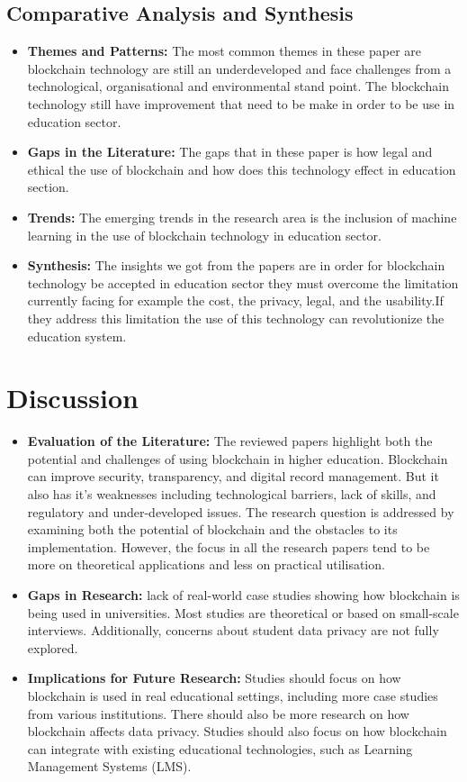 \documentclass[12pt,a4paper]{article}
\begin{document}
\subsection{Comparative Analysis and Synthesis}
\begin{itemize}
    \item \textbf{Themes and Patterns:} The most common themes in these paper are blockchain technology are still an underdeveloped and face challenges from a technological, organisational and environmental stand point. The blockchain technology still have improvement that need to be make in order to be use in education sector.
    \item \textbf{Gaps in the Literature:} The gaps that in these paper is how legal and ethical the use of blockchain and how does this technology effect in education section.
    \item \textbf{Trends:} The emerging trends in the research area is the inclusion of machine learning in the use of blockchain technology in education sector. 
    \item \textbf{Synthesis:} The insights we got from the papers are in order for blockchain technology be accepted in education sector they must overcome the limitation currently facing for example the cost, the privacy, legal, and the usability.If they address this limitation the use of this technology can revolutionize the education system.
\end{itemize}

\section{Discussion}
\begin{itemize}
    \item \textbf{Evaluation of the Literature:} The reviewed papers highlight both the potential and challenges of using blockchain in higher education. Blockchain can improve security, transparency, and digital record management. But it also has it's weaknesses including technological barriers, lack of skills, and regulatory and under-developed issues. The research question is addressed by examining both the potential of blockchain and the obstacles to its implementation. However, the focus in all the research papers tend to be more on theoretical applications and less on practical utilisation.
    \item \textbf{Gaps in Research:} lack of real-world case studies showing how blockchain is being used in universities. Most studies are theoretical or based on small-scale interviews.  Additionally, concerns about student data privacy are not fully explored.
    \item \textbf{Implications for Future Research:} Studies should focus on how blockchain is used in real educational settings, including more case studies from various institutions. There should also be more research on how blockchain affects data privacy. Studies should also focus on how blockchain can integrate with existing educational technologies, such as Learning Management Systems (LMS).
\end{itemize}
\end{document}
